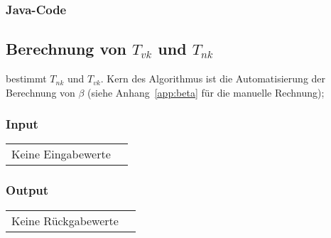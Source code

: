 \subsubsection*{Java-Code}



\clearpage
\subsection{Berechnung von $T_{vk}$ und $T_{nk}$}
\label{app:algo:tnktvk}

    bestimmt   $T_{nk}$    und   $T_{vk}$. Kern    des
Algorithmus  ist  die  Automatisierung   der  Berechnung  von  $\beta$  (siehe
Anhang~\ref{app:beta} f\"ur die manuelle Rechnung);

\subsubsection*{Input}

\begin{tabular}{p{40mm}l}
    Keine Eingabewerte &
\end{tabular}

\subsubsection*{Output}
\begin{tabular}{p{40mm}l}
    Keine R\"uckgabewerte &
\end{tabular}


